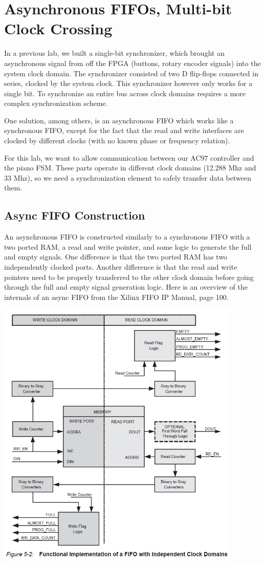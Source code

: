 \documentclass[11pt]{article}
\begin{document}
\section{Asynchronous FIFOs, Multi-bit Clock Crossing}
In a previous lab, we built a single-bit synchronizer, which brought an asynchronous signal from off the FPGA (buttons, rotary encoder signals) into the system clock domain. The synchronizer consisted of two D flip-flops connected in series, clocked by the system clock. This synchronizer however only works for a single bit. To synchronize an entire bus across clock domains requires a more complex synchronization scheme.

One solution, among others, is an asynchronous FIFO which works like a synchronous FIFO, except for the fact that the read and write interfaces are clocked by different clocks (with no known phase or frequency relation).

For this lab, we want to allow communication between our AC97 controller and the piano FSM. These parts operate in different clock domains (12.288 Mhz and 33 Mhz), so we need a synchronization element to safely transfer data between them.

\subsection{Async FIFO Construction}
An asynchronous FIFO is constructed similarly to a synchronous FIFO with a two ported RAM, a read and write pointer, and some logic to generate the full and empty signals. One difference is that the two ported RAM has two independently clocked ports. Another difference is that the read and write pointers need to be properly transferred to the other clock domain before going through the full and empty signal generation logic. Here is an overview of the internals of an async FIFO from the Xilinx FIFO IP Manual, page 100.

\begin{center}
	\includegraphics[height=13cm]{async_fifo_diagram.png}
\end{center}
\end{document}
